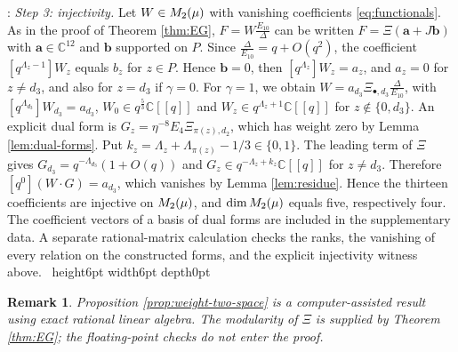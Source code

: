 \documentclass[leqno]{article}
\newcommand{\Cbb}{\ensuremath{\mathbb{C}}}
\let\cal\relax
\newcommand{\cal}{\mathcal}
\newcommand{\qed}{\hfill \vrule height6pt  width6pt depth0pt}
\newtheorem{remark}[thm]{Remark}
\newenvironment{proof}[1][]{\noindent {\it Proof #1} : }{\hbox{~}\qed
\smallskip
}
\numberwithin{equation}{section}
\begin{document}
\begin{proof}
\textit{Step 3: injectivity.} Let $W \in \cal M_2(\mu)$ with vanishing coefficients \eqref{eq:functionals}. As in the proof of Theorem \ref{thm:EG}, $F = W\frac{E_{10}}{\Delta}$ can be written $F = \Xi(\mathbf a+J\mathbf b)$ with $\mathbf a \in \Cbb^{12}$ and $\mathbf b$ supported on $P$. Since $\frac{\Delta}{E_{10}} = q+O(q^2)$, the coefficient $[q^{\Lambda_z-1}]W_z$ equals $b_z$ for $z \in P$. Hence $\mathbf b = 0$, then $[q^{\Lambda_z}]W_z = a_z$, and $a_z = 0$ for $z \neq d_3$, and also for $z = d_3$ if $\gamma = 0$. For $\gamma = 1$, we obtain $W = a_{d_3}\Xi_{\bullet,d_3}\frac{\Delta}{E_{10}}$, with $[q^{\Lambda_{d_3}}]W_{d_3} = a_{d_3}$, $W_0 \in q^{\frac53}\Cbb[[q]]$ and $W_z \in q^{\Lambda_z+1}\Cbb[[q]]$ for $z \notin \{0,d_3\}$. An explicit dual form is $G_z = \eta^{-8}E_4\Xi_{\pi(z),d_2}$, which has weight zero by Lemma \ref{lem:dual-forms}. Put $k_z = \Lambda_z+\Lambda_{\pi(z)}-1/3 \in \{0,1\}$. The leading term of $\Xi$ gives $G_{d_3} = q^{-\Lambda_{d_3}}(1+O(q))$ and $G_z \in q^{-\Lambda_z+k_z}\Cbb[[q]]$ for $z \neq d_3$. Therefore $[q^0](W\cdot G) = a_{d_3}$, which vanishes by Lemma \ref{lem:residue}. Hence the thirteen coefficients are injective on $\cal M_2(\mu)$, and $\dim \cal M_2(\mu)$ equals five, respectively four. The coefficient vectors of a basis of dual forms are included in the supplementary data. A separate rational-matrix calculation checks the ranks, the vanishing of every relation on the constructed forms, and the explicit injectivity witness above.
\end{proof}

\begin{remark}\normalfont
\label{rem:exactness}
Proposition \ref{prop:weight-two-space} is a computer-assisted result using exact rational linear algebra. The modularity of $\Xi$ is supplied by Theorem \ref{thm:EG}; the floating-point checks do not enter the proof.
\end{remark}
\end{document}

